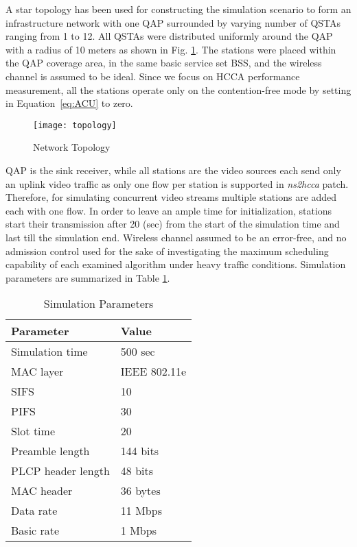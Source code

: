 \documentclass[a4paper, conference]{IEEEtran}
\begin{document}
A star topology has been used for constructing the simulation scenario to form an infrastructure network with one QAP surrounded by varying number of QSTAs ranging from 1 to 12. All QSTAs were distributed uniformly around the QAP with a radius of 10 meters as shown in Fig. \ref{fig:topology}. The stations were placed within the QAP coverage area, in the same basic service set BSS, and the wireless channel is assumed to be ideal. Since we focus on HCCA performance measurement, all the stations operate only on the contention-free mode by setting  in Equation~\eqref{eq:ACU} to zero.
\begin{figure}[hbtp]
\centering
\texttt{[image: topology]}
\caption{Network Topology}
\label{fig:topology}
\end{figure}
QAP is the sink receiver, while all stations are the video sources each send only an uplink video traffic as only one flow per station is supported in \textit{ns2hcca} patch. Therefore, for simulating concurrent video streams multiple stations are added each with one flow. In order to leave an ample time for initialization, stations start their transmission after 20 (sec) from the start of the simulation time and last till the simulation end. Wireless channel assumed to be an error-free, and no admission control used for the sake of investigating the maximum scheduling capability of each examined algorithm under heavy traffic conditions. Simulation parameters are summarized in Table \ref{tab:SimPars}.
\begin{table}
    \caption {Simulation Parameters}
    \centering
    \begin{tabular}[width=\linewidt]{p{6cm}p{2.2cm}}
    \hline
    Parameter			& Value			\\ \hline
    Simulation time		& 500 sec		\\
MAC layer			& IEEE 802.11e	\\
    SIFS				& 10 	\\
    PIFS				& 30 	\\
    Slot time			& 20 	\\
    Preamble length		& 144 bits		\\
    PLCP header length	& 48 bits		\\
MAC header			& 36 bytes		\\
    Data rate			& 11 Mbps		\\
    Basic rate			& 1 Mbps		\\ \hline
    \end{tabular}
    \label{tab:SimPars}
\end{table}
\end{document}
